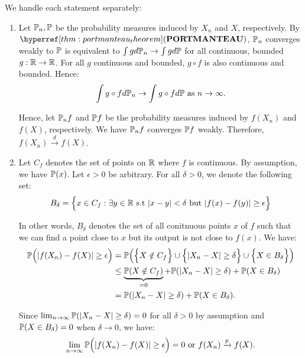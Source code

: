 \begin{proof*}
    We handle each statement separately:

    \begin{enumerate}
        \item Let $\mathbb{P}_n, \mathbb{P}$ be the probability measures induced by $X_n$ and $X$, respectively. By $\PORT$, $\mathbb{P}_n$ converges weakly to $\mathbb{P}$ is equivalent to $\int gd\mathbb{P}_n \to \int gd\mathbb{P}$ for all continuous, bounded $g: \mathbb{R}\to\mathbb{R}$. For all $g$ continuous and bounded, $g\circ f$ is also continuous and bounded. Hence:
        \begin{align*}
            \int g\circ fd\mathbb{P}_n \to \int g\circ fd\mathbb{P} \text{ as } n\to\infty. 
        \end{align*} 

        \noindent Hence, let $\mathbb{P}_n f$ and $\mathbb{P} f$ be the probability measures induced by $f(X_n)$ and $f(X)$, respectively. We have $\mathbb{P}_n f$ converges $\mathbb{P} f$ weakly. Therefore, $f(X_n) \xrightarrow{d} f(X)$.

        \item Let $C_f$ denotes the set of points on $\mathbb{R}$ where $f$ is continuous. By assumption, we have $\mathbb{P}(x)$. Let $\epsilon>0$ be arbitrary. For all $\delta>0$, we denote the following set:
        \begin{align*}
            B_\delta = \Big\{ 
                x\in C_f : \exists y\in\mathbb{R} \text{ s.t } |x-y| < \delta \text{ but } |f(x) - f(y)| \ge \epsilon
             \Big\}
        \end{align*} 

        \noindent In other words, $B_\delta$ denotes the set of all conitnuous points $x$ of $f$ such that we can find a point close to $x$ but its output is not close to $f(x)$. We have:
        \begin{align*}
            \mathbb{P}\Big( |f(X_n) - f(X)| \ge \epsilon \Big) &= \mathbb{P}\Big( 
                \Big\{ X \notin C_f \Big\} \cup \Big\{ |X_n - X| \ge \delta \Big\} \cup \Big\{ X \in B_\delta \Big\}
             \Big) \\ 
            &\le \underbrace{\mathbb{P}(X\notin C_f)}_{=0} + \mathbb{P}(|X_n - X| \ge \delta) + \mathbb{P}(X\in B_\delta) \\ 
            &= \mathbb{P}(|X_n - X| \ge \delta) + \mathbb{P}(X\in B_\delta).
        \end{align*} 

        \noindent Since $\lim_{n\to\infty}\mathbb{P}(|X_n - X| \ge \delta)=0$ for all $\delta>0$ by assumption and $\mathbb{P}(X\in B_\delta)=0$ when $\delta\to0$, we have:
        \begin{align*}
            \lim_{n\to\infty} \mathbb{P}\Big( |f(X_n) - f(X)| \ge \epsilon \Big) = 0 \text{ or } f(X_n) \xrightarrow{p} f(X).
        \end{align*} 


\end{enumerate}
\end{proof*}
